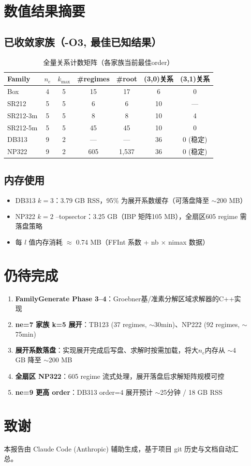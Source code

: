 \documentclass[12pt,a4paper]{article}
\begin{document}
\section{数值结果摘要}

\subsection{已收敛家族（-O3, 最佳已知结果）}

\begin{table}[h]
\centering
\caption{全量关系计数矩阵（各家族当前最佳order）}
\begin{tabular}{lcccccc}
\toprule
Family & $n_e$ & $k_{\max}$ & \#regimes & \#root & (3,0)关系 & (3,1)关系 \\
\midrule
Box      & 4 & 5 & 15 & 17    & 6  & 0 \\
SR212    & 5 & 5 & 6  & 6     & 10 & — \\
SR212-3m & 5 & 5 & 8  & 8     & 10 & 4 \\
SR212-5m & 5 & 5 & 45 & 45   & 10 & 0 \\
DB313    & 9 & 2 & — & —     & 36 & 0 (稳定) \\
NP322    & 9 & 2 & 605 & 1,537 & 36 & 0 (稳定) \\
\bottomrule
\end{tabular}
\end{table}

\subsection{内存使用}
\begin{itemize}[nosep]
    \item DB313 $k=3$：3.79 GB RSS，95\% 为展开系数缓存（可落盘降至 $\sim$200 MB）
    \item NP322 $k=2$ --topsector：3.25 GB（IBP 矩阵105 MB），全扇区605 regime 需落盘策略
    \item 每 $l$ 值内存消耗 $\approx$ 0.74 MB（FFInt 系数 + nb $\times$ nimax 数据）
\end{itemize}

\section{仍待完成}

\begin{enumerate}[nosep]
    \item \textbf{FamilyGenerate Phase 3--4}：Groebner基/准素分解区域求解器的C++实现
    \item \textbf{ne=7 家族 k=5 展开}：TB123 (37 regimes, $\sim$30min)、NP222 (92 regimes, $\sim$75min)
    \item \textbf{展开系数落盘}：实现展开完成后写盘、求解时按需加载，将大$n_e$内存从
    $\sim$4 GB 降至 $\sim$200 MB
    \item \textbf{全扇区 NP322}：605 regime 流式处理，展开落盘后求解矩阵规模可控
    \item \textbf{ne=9 更高 order}：DB313 order=4 展开预计 $\sim$25分钟 / 18 GB RSS
\end{enumerate}

\section*{致谢}

本报告由 Claude Code (Anthropic) 辅助生成，基于项目 git 历史与文档自动汇总。
\end{document}
